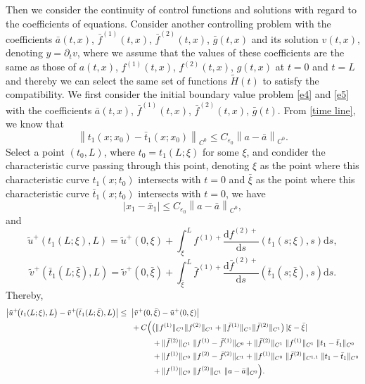 \documentclass[a4paper,reqno,11pt]{amsart}
\numberwithin{equation}{section} %
\begin{document}
Then we consider the continuity of control functions and solutions with regard to the coefficients of equations.
Consider another controlling problem with the coefficients $\bar{a} (t,x)$, $\bar{f}^{(1)} (t,x)$, $\bar{f}^{(2)} (t,x)$, $\bar{g} (t,x)$ and its solution $v(t,x)$, denoting $y = \partial_t v$, where we assume that the values of these coefficients are the same as those of $a(t,x)$, $f^{(1)}(t,x)$, $f^{(2)}(t,x)$, $g(t,x)$ at $t=0$ and $t=L$ and thereby we can select the same set of functions $\widetilde{H}(t)$ to satisfy the compatibility.
We first consider the initial boundary value problem \eqref{e4} and \eqref{e5} with the coefficients $\bar{a}(t,x)$, $\bar{f}^{(1)} (t,x)$, $\bar{f}^{(2)} (t,x)$, $\bar{g} (t)$.%
From \eqref{time line}, we know that
$$
\left\| t_1\left( x;x_0 \right) -\bar{t}_1\left( x;x_0 \right) \right\| _{C^0}\leq C_{\varepsilon _0} \left\lVert a-\bar{a}\right\rVert _{C^0}.
$$
Select a point $(t_0,L)$, where $t_0=t_1\left( L;\xi \right)$ for some $\xi$, and condider the characteristic curve passing through this point, denoting $\xi$ as the point where this characteristic curve $t_1(x;t_0)$ intersects with $t=0$ and $\bar{\xi}$ as the point where this characteristic curve $\bar{t}_1(x;t_0)$ intersects with $t=0$, we have
$$
\left| x_1-\bar{x}_1 \right|\leq C_{\varepsilon _0}\left\| a-\bar{a} \right\| _{C^0},
$$
and
$$
\tilde{u}^{+}\left( t_1\left( L;\xi \right) ,L \right) =\tilde{u}^{+}(0,\xi )+\int_{\xi}^L{f^{(1)+}\frac{\mathrm{d}f^{(2)+}}{\mathrm{d}s}\left( t_1\left( s;\xi \right) ,s \right) \mathrm{d}s},
$$
$$
\tilde{v}^{+}\left( \bar{t}_1\left( L;\bar{\xi} \right) ,L \right) =\tilde{v}^{+}(0,\bar{\xi})+\int_{\bar{\xi} }^L{\bar{f}^{(1)+}\frac{\mathrm{d}\bar{f}^{(2)+}}{\mathrm{d}s}\left( \bar{t}_1\left( s;\bar{\xi} \right) ,s \right) \mathrm{d}s}.
$$
Thereby,
$$
\begin{aligned}
\bigl|\tilde u^+\!\bigl(t_1(L;\xi),L\bigr)-\tilde{v}^{+}\!\bigl(\bar t_1(L;\bar\xi),L\bigr)\bigr|
\le{}&\ \bigl|\tilde{v}^{+}(0,\bar\xi)-\tilde u^+(0,\xi)\bigr| \\
&\ + C\Bigl(
   \bigl(\|f^{(1)}\|_{C^{1}}\|f^{(2)}\|_{C^{1}}
     + \|\bar f^{(1)}\|_{C^{1}}\|\bar f^{(2)}\|_{C^{1}}\bigr)\,|\xi-\bar\xi| \Bigr.\\
&\qquad\quad
   + \|\bar f^{(2)}\|_{C^{1}}\;\|f^{(1)}-\bar f^{(1)}\|_{C^{0}}
   + \|\bar f^{(2)}\|_{C^{1}}\;\|f^{(1)}\|_{C^{1}}\;\|t_1-\bar t_1\|_{C^{0}} \\
&\qquad\quad
   + \|f^{(1)}\|_{C^{0}}\;\|f^{(2)}-\bar f^{(2)}\|_{C^{1}}
   + \|f^{(1)}\|_{C^{0}}\;\|\bar f^{(2)}\|_{C^{1,1}}\;\|t_1-\bar t_1\|_{C^{0}} \\
&\qquad\quad
   + \Bigl. \|f^{(1)}\|_{C^{0}}\;\|f^{(2)}\|_{C^{1}}\;\|a-\bar a\|_{C^{0}}
\Bigr).
\end{aligned}
$$
\end{document}
